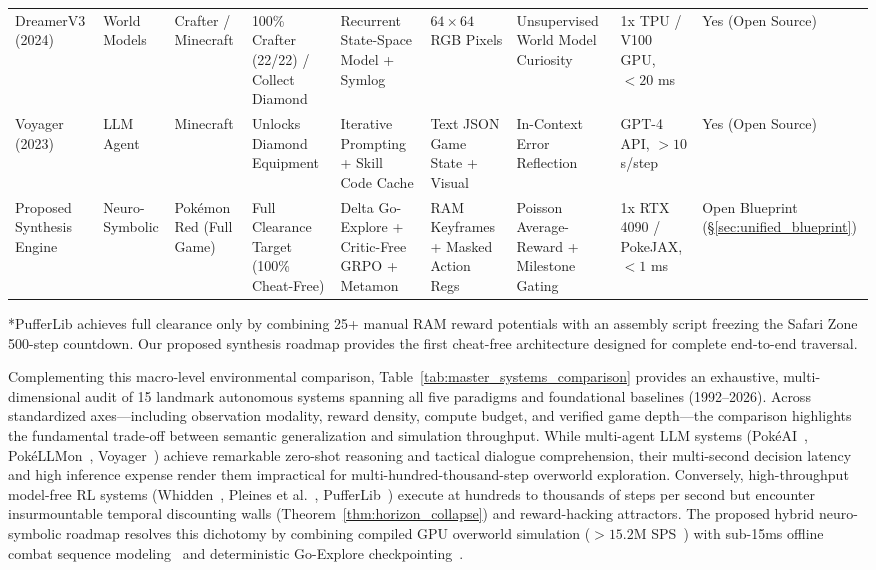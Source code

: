 \documentclass[journal,10pt,twocolumn]{IEEEtran}
\begin{document}
\begin{table}[t]
{\begin{tabular}{@{}lllllllll@{}}
DreamerV3 (2024)~\cite{hafner2024dreamerv3} & World Models & Crafter / Minecraft & 100\% Crafter (22/22) / Collect Diamond & Recurrent State-Space Model + Symlog & $64 \times 64$ RGB Pixels & Unsupervised World Model Curiosity & 1x TPU / V100 GPU, $<20$ ms & Yes (Open Source) \\
Voyager (2023)~\cite{wang2023voyager} & LLM Agent & Minecraft & Unlocks Diamond Equipment & Iterative Prompting + Skill Code Cache & Text JSON Game State + Visual & In-Context Error Reflection & GPT-4 API, $>10$ s/step & Yes (Open Source) \\
Proposed Synthesis Engine & Neuro-Symbolic & Pok{\'e}mon Red (Full Game) & Full Clearance Target (100\% Cheat-Free) & Delta Go-Explore + Critic-Free GRPO + Metamon & RAM Keyframes + Masked Action Regs & Poisson Average-Reward + Milestone Gating & 1x RTX 4090 / PokeJAX, $<1$ ms & Open Blueprint (\S\ref{sec:unified_blueprint}) \\ \bottomrule
\end{tabular}%
}
\vspace{1mm}
\footnotesize{*PufferLib achieves full clearance only by combining 25+ manual RAM reward potentials with an assembly script freezing the Safari Zone 500-step countdown. Our proposed synthesis roadmap provides the first cheat-free architecture designed for complete end-to-end traversal.}
\end{table}

Complementing this macro-level environmental comparison, Table~\ref{tab:master_systems_comparison} provides an exhaustive, multi-dimensional audit of 15 landmark autonomous systems spanning all five paradigms and foundational baselines (1992--2026). Across standardized axes---including observation modality, reward density, compute budget, and verified game depth---the comparison highlights the fundamental trade-off between semantic generalization and simulation throughput. While multi-agent LLM systems (Pok{\'e}AI~\cite{liu2025pokeai}, Pok{\'e}LLMon~\cite{hu2024pokellmon}, Voyager~\cite{wang2023voyager}) achieve remarkable zero-shot reasoning and tactical dialogue comprehension, their multi-second decision latency and high inference expense render them impractical for multi-hundred-thousand-step overworld exploration. Conversely, high-throughput model-free RL systems (Whidden~\cite{whidden2023pokemonred}, Pleines et al.~\cite{pleines2025pokemon}, PufferLib~\cite{rubinstein2025puffer}) execute at hundreds to thousands of steps per second but encounter insurmountable temporal discounting walls (Theorem~\ref{thm:horizon_collapse}) and reward-hacking attractors. The proposed hybrid neuro-symbolic roadmap resolves this dichotomy by combining compiled GPU overworld simulation ($>15.2$M SPS~\cite{karten2026autogen}) with sub-15ms offline combat sequence modeling~\cite{grigsby2025metamon} and deterministic Go-Explore checkpointing~\cite{ecoffet2021goexplore}.
\end{document}
